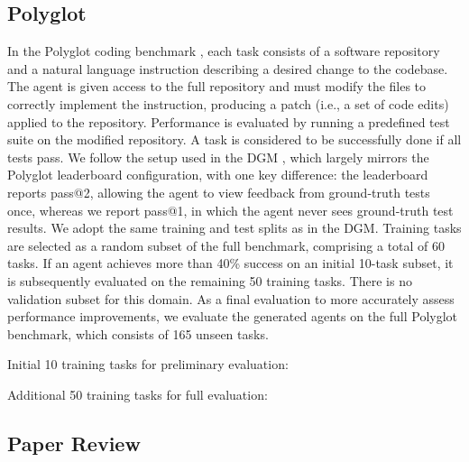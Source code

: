 \documentclass[]{fairmeta}
\begin{document}
\subsection{Polyglot}
\label{app:domain-polyglot}

In the Polyglot coding benchmark \citep{gauthier2024polyglot}, each task consists of a software repository and a natural language instruction describing a desired change to the codebase. The agent is given access to the full repository and must modify the files to correctly implement the instruction, producing a patch (i.e., a set of code edits) applied to the repository. Performance is evaluated by running a predefined test suite on the modified repository. A task is considered to be successfully done if all tests pass. We follow the setup used in the DGM \citep{zhang2025darwin}, which largely mirrors the Polyglot leaderboard configuration, with one key difference: the leaderboard reports pass@2, allowing the agent to view feedback from ground-truth tests once, whereas we report pass@1, in which the agent never sees ground-truth test results. We adopt the same training and test splits as in the DGM. Training tasks are selected as a random subset of the full benchmark, comprising a total of 60 tasks. If an agent achieves more than 40\% success on an initial 10-task subset, it is subsequently evaluated on the remaining 50 training tasks. There is no validation subset for this domain. As a final evaluation to more accurately assess performance improvements, we evaluate the generated agents on the full Polyglot benchmark, which consists of 165 unseen tasks.

Initial 10 training tasks for preliminary evaluation:

Additional 50 training tasks for full evaluation:


\subsection{Paper Review}
\label{app:domain-paperreview}
\end{document}
